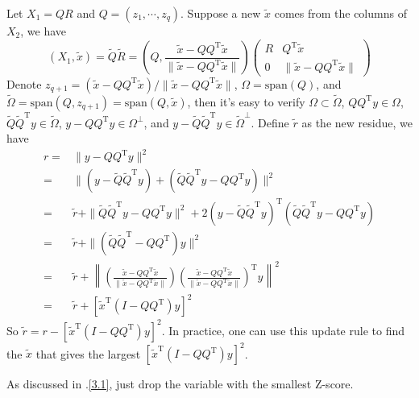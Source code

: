 \begin{sol}
Let $X_1=QR$ and $Q=(z_1,\cdots,z_q)$. Suppose a new $\tilde{x}$ comes from the columns of $X_2$, we have
\[
(X_1, \tilde{x})=\tilde{Q}\tilde{R}=\left(Q,\frac{\tilde{x}-QQ^\mathrm{T}\tilde{x}}{\|\tilde{x}-QQ^\mathrm{T}\tilde{x}\|}\right)
\begin{pmatrix}
R & Q^\mathrm{T}\tilde{x}\\
0 & \|\tilde{x}-QQ^\mathrm{T}\tilde{x}\|
\end{pmatrix}
\]
Denote $z_{q+1}=(\tilde{x}-QQ^\mathrm{T}\tilde{x})/\|\tilde{x}-QQ^\mathrm{T}\tilde{x}\|$, $\Omega=\mathrm{span}(Q)$, and $\tilde{\Omega}=\mathrm{span}(Q,z_{q+1})=\mathrm{span}(Q,\tilde{x})$, then it's easy to verify
$\Omega\subset\tilde{\Omega}$, $QQ^\mathrm{T}y\in \Omega$, $\tilde{Q}\tilde{Q}^\mathrm{T}y\in \tilde{\Omega}$, $y-QQ^\mathrm{T}y\in \Omega^\perp$, and $y-\tilde{Q}\tilde{Q}^\mathrm{T}y\in \tilde{\Omega}^\perp$. Define $\tilde{r}$ as the new residue, we have
\begin{align*}
r =& \|y-QQ^\mathrm{T}y\|^2\\
=& \|(y-\tilde{Q}\tilde{Q}^\mathrm{T}y)+(\tilde{Q}\tilde{Q}^\mathrm{T}y-QQ^\mathrm{T}y)\|^2\\
=& \tilde{r} + \|\tilde{Q}\tilde{Q}^\mathrm{T}y-QQ^\mathrm{T}y\|^2 + 2(y-\tilde{Q}\tilde{Q}^\mathrm{T}y)^\mathrm{T}(\tilde{Q}\tilde{Q}^\mathrm{T}y-QQ^\mathrm{T}y)\\
=& \tilde{r} + \|(\tilde{Q}\tilde{Q}^\mathrm{T}-QQ^\mathrm{T})y\|^2\\
=& \tilde{r} + \left\|\left(\frac{\tilde{x}-QQ^\mathrm{T}\tilde{x}}{\|\tilde{x}-QQ^\mathrm{T}\tilde{x}\|}\right)\left(\frac{\tilde{x}-QQ^\mathrm{T}\tilde{x}}{\|\tilde{x}-QQ^\mathrm{T}\tilde{x}\|}\right)^\mathrm{T}y\right\|^2\\
=& \tilde{r} + \left[\tilde{x}^\mathrm{T}(I-QQ^\mathrm{T})y\right]^2
\end{align*}
So $\tilde{r}=r-[\tilde{x}^\mathrm{T}(I-QQ^\mathrm{T})y]^2$. In practice, one can use this update rule to find the $\tilde{x}$ that gives the largest $\left[\tilde{x}^\mathrm{T}(I-QQ^\mathrm{T})y\right]^2$.
\end{sol}

\begin{sol}
As discussed in \thesection.\ref{3.1}, just drop the variable with the smallest Z-score.
\end{sol}